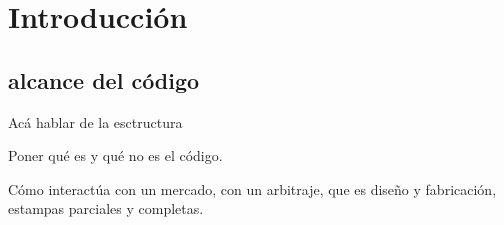



















\newpage
\section{Introducción}

\subsection{alcance del código}
Acá hablar de la esctructura

Poner qué es y qué no es el código.

Cómo interactúa con un mercado, con un arbitraje, que es diseño y fabricación, estampas parciales y completas.

